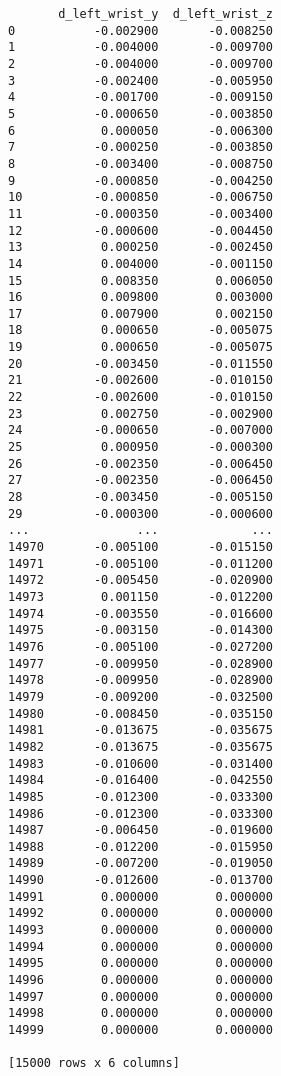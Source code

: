 \documentclass[11pt]{article}
\begin{document}
\begin{verbatim}
       d_left_wrist_y  d_left_wrist_z  
0           -0.002900       -0.008250  
1           -0.004000       -0.009700  
2           -0.004000       -0.009700  
3           -0.002400       -0.005950  
4           -0.001700       -0.009150  
5           -0.000650       -0.003850  
6            0.000050       -0.006300  
7           -0.000250       -0.003850  
8           -0.003400       -0.008750  
9           -0.000850       -0.004250  
10          -0.000850       -0.006750  
11          -0.000350       -0.003400  
12          -0.000600       -0.004450  
13           0.000250       -0.002450  
14           0.004000       -0.001150  
15           0.008350        0.006050  
16           0.009800        0.003000  
17           0.007900        0.002150  
18           0.000650       -0.005075  
19           0.000650       -0.005075  
20          -0.003450       -0.011550  
21          -0.002600       -0.010150  
22          -0.002600       -0.010150  
23           0.002750       -0.002900  
24          -0.000650       -0.007000  
25           0.000950       -0.000300  
26          -0.002350       -0.006450  
27          -0.002350       -0.006450  
28          -0.003450       -0.005150  
29          -0.000300       -0.000600  
...               ...             ...  
14970       -0.005100       -0.015150  
14971       -0.005100       -0.011200  
14972       -0.005450       -0.020900  
14973        0.001150       -0.012200  
14974       -0.003550       -0.016600  
14975       -0.003150       -0.014300  
14976       -0.005100       -0.027200  
14977       -0.009950       -0.028900  
14978       -0.009950       -0.028900  
14979       -0.009200       -0.032500  
14980       -0.008450       -0.035150  
14981       -0.013675       -0.035675  
14982       -0.013675       -0.035675  
14983       -0.010600       -0.031400  
14984       -0.016400       -0.042550  
14985       -0.012300       -0.033300  
14986       -0.012300       -0.033300  
14987       -0.006450       -0.019600  
14988       -0.012200       -0.015950  
14989       -0.007200       -0.019050  
14990       -0.012600       -0.013700  
14991        0.000000        0.000000  
14992        0.000000        0.000000  
14993        0.000000        0.000000  
14994        0.000000        0.000000  
14995        0.000000        0.000000  
14996        0.000000        0.000000  
14997        0.000000        0.000000  
14998        0.000000        0.000000  
14999        0.000000        0.000000  

[15000 rows x 6 columns]
    \end{verbatim}
\end{document}
